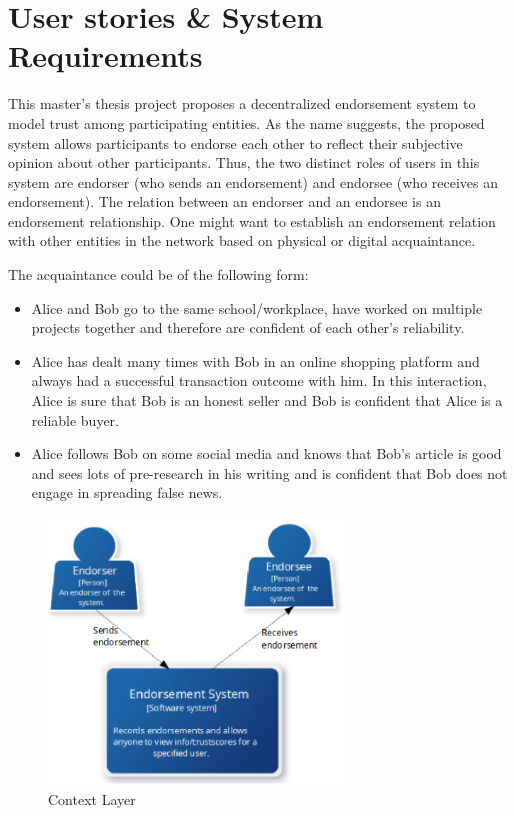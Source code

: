 \section{User stories \& System Requirements} \label{ch:UserStories}
This master's thesis project proposes a decentralized endorsement system to
model trust among participating entities. As the name suggests, the proposed
system allows participants to endorse each other to reflect their subjective
opinion about other participants. Thus, the two distinct roles of users in this
system are endorser (who sends an endorsement) and endorsee (who receives an
endorsement). The relation between an endorser and an endorsee is an
endorsement relationship. One might want to establish an endorsement relation
with other entities in the network based on physical or digital acquaintance.
\par
The acquaintance could be of the following form: 
\begin{itemize}
	\item Alice and Bob go to the same school/workplace, have worked on
		multiple projects together and therefore are confident of each other's
		reliability.
	\item Alice has dealt many times with Bob in an online shopping platform
		and always had a successful transaction outcome with him. In this
		interaction, Alice is sure that Bob is an honest seller and Bob is
		confident that Alice is a reliable buyer.
	\item Alice follows Bob on some social media and knows that Bob's article
		is good and sees lots of pre-research in his writing and is confident
		that Bob does not engage in spreading false news. 
\end{itemize}
\begin{figure}
	\centering
	\includegraphics[width=0.7\textwidth]{Images/ContextLayer.eps}
	\caption{Context Layer}
	\label{fig:context}
\end{figure}
